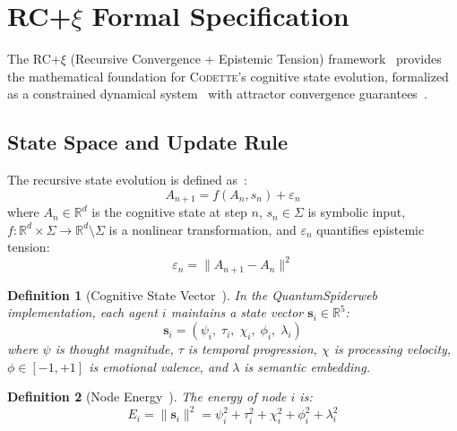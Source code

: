 \documentclass[conference]{IEEEtran}
\newtheorem{definition}{Definition}
\newcommand{\codette}{\textsc{Codette}}
\begin{document}
\section{RC+$\xi$ Formal Specification}
\label{sec:rcxi}

The RC+$\xi$ (Recursive Convergence + Epistemic Tension) framework~\cite{harrison2026codettefull} provides the mathematical foundation for \codette{}'s cognitive state evolution, formalized as a constrained dynamical system~\cite{khalil2002nonlinear} with attractor convergence guarantees~\cite{strogatz2015nonlinear}.

\subsection{State Space and Update Rule}

The recursive state evolution is defined as~\cite{harrison2026codettefull}:
\begin{equation}
  A_{n+1} = f(A_n, s_n) + \varepsilon_n
  \label{eq:state_evolution}
\end{equation}
where $A_n \in \mathbb{R}^d$ is the cognitive state at step $n$, $s_n \in \Sigma$ is symbolic input, $f: \mathbb{R}^d \times \Sigma \to \mathbb{R}^d \setminus \Sigma$ is a nonlinear transformation, and $\varepsilon_n$ quantifies epistemic tension:
\begin{equation}
  \varepsilon_n = \|A_{n+1} - A_n\|^2
  \label{eq:tension}
\end{equation}

\begin{definition}[Cognitive State Vector~\cite{harrison2026codettefull}]
\label{def:state}
In the QuantumSpiderweb implementation, each agent $i$ maintains a state vector $\mathbf{s}_i \in \mathbb{R}^5$:
\begin{equation}
  \mathbf{s}_i = (\psi_i,\; \tau_i,\; \chi_i,\; \phi_i,\; \lambda_i)
  \label{eq:state_vector}
\end{equation}
where $\psi$ is thought magnitude, $\tau$ is temporal progression, $\chi$ is processing velocity, $\phi \in [-1, +1]$ is emotional valence, and $\lambda$ is semantic embedding.
\end{definition}

\begin{definition}[Node Energy~\cite{harrison2026codettefull}]
\label{def:energy}
The energy of node $i$ is:
\begin{equation}
  E_i = \|\mathbf{s}_i\|^2 = \psi_i^2 + \tau_i^2 + \chi_i^2 + \phi_i^2 + \lambda_i^2
  \label{eq:energy}
\end{equation}
\end{definition}
\end{document}
